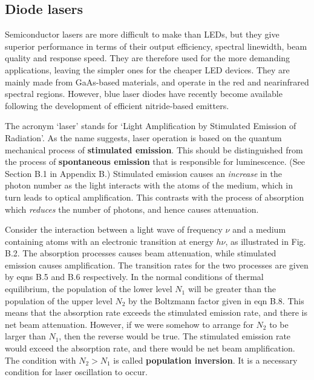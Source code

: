 \documentclass[12pt]{book}
\begin{document}
{\subsection{Diode lasers}
Semiconductor lasers are more difficult to make than LEDs, but they give superior performance in terms of their output efficiency, spectral linewidth, beam quality and response speed. They are therefore used for the more demanding applications, leaving the simpler ones for the cheaper LED devices. They are mainly made from GaAs-based materials, and operate in the red and nearinfrared spectral regions. However, blue laser diodes have recently become available following the development of efficient nitride-based emitters.

The acronym `laser' stands for `Light Amplification by Stimulated Emission of Radiation'. As the name suggests, laser operation is based on the quantum mechanical process of \textbf{stimulated emission}. This should be distinguished from the process of \textbf{spontaneous emission} that is responsible for luminescence. (See Section B.1 in Appendix B.) Stimulated emission causes an \textit{increase} in the photon number as the light interacts with the atoms of the medium, which in turn leads to optical amplification. This contrasts with the process of absorption which \textit{reduces} the number of photons, and hence causes attenuation.

Consider the interaction between a light wave of frequency $\nu$ and a medium containing atoms with an electronic transition at energy $h\nu$, as illustrated in Fig. B.2. The absorption processes causes beam attenuation, while stimulated emission causes amplification. The transition rates for the two processes are given by eqns B.5 and B.6 respectively. In the normal conditions of thermal equilibrium, the population of the lower level $N_1$ will be greater than the population of the upper level $N_2$ by the Boltzmann factor given in eqn B.8. This means that the absorption rate exceeds the stimulated emission rate, and there is net beam attenuation. However, if we were somehow to arrange for $N_2$ to be larger than $N_1$, then the reverse would be true. The stimulated emission rate would exceed the absorption rate, and there would be net beam amplification. The condition with $N_2 > N_1$ is called \textbf{population inversion}. It is a necessary condition for laser oscillation to occur.

}
\end{document}
